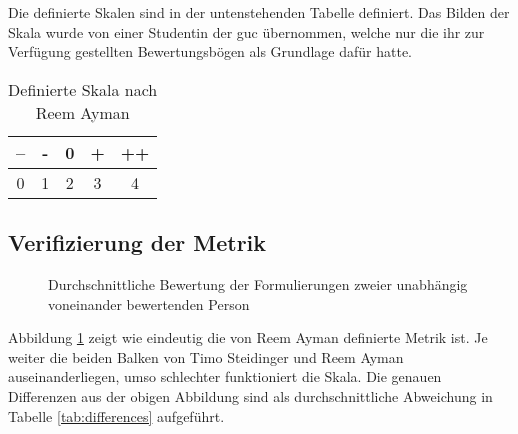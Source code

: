 Die definierte Skalen sind in der untenstehenden Tabelle definiert. Das Bilden der Skala wurde von einer Studentin der \acrlong{guc} übernommen, welche nur die ihr zur Verfügung gestellten Bewertungsbögen als Grundlage dafür hatte.

\begin{table}[H]
	\centering
	\begin{tabular}{|c|c|c|c|c|}
		\hline
		-- & - & 0 & + & ++ \\
		\hline
		0 & 1 & 2 & 3 & 4 \\
		\hline
	\end{tabular}
	\caption{Definierte Skala nach Reem Ayman}
\end{table}
\subsection{Verifizierung der Metrik}
\begin{figure}[H]
	\centering

	\caption[Durchschnittliche Bewertung der Formulierungen]{Durchschnittliche Bewertung der Formulierungen zweier unabhängig voneinander bewertenden Person}
	\label{img:verificationMetric}
\end{figure}
Abbildung \ref{img:verificationMetric} zeigt wie eindeutig die von Reem Ayman definierte Metrik ist. Je weiter die beiden Balken von Timo Steidinger und Reem Ayman auseinanderliegen, umso schlechter funktioniert die Skala. Die genauen Differenzen aus der obigen Abbildung sind als durchschnittliche Abweichung in Tabelle \ref{tab:differences} aufgeführt.

